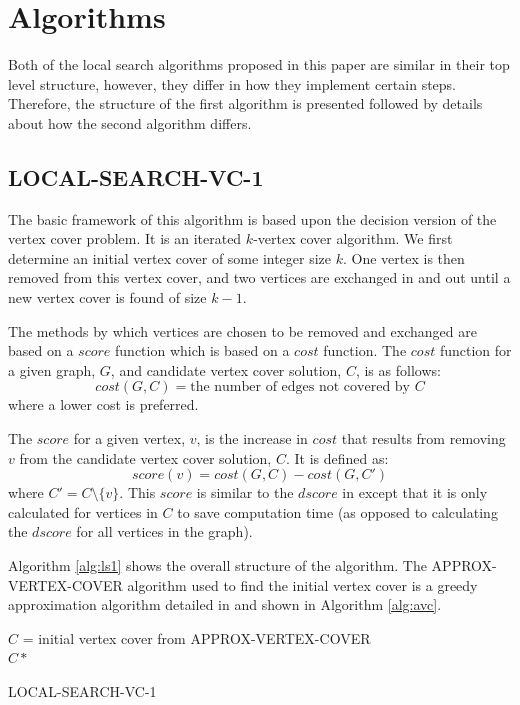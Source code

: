 \documentclass[sigconf]{acmart}
\begin{document}
\section{Algorithms}
Both of the local search algorithms proposed in this paper are similar in their top level structure, however, they differ in how they implement certain steps. Therefore, the structure of the first algorithm is presented followed by details about how the second algorithm differs.
\subsection{LOCAL-SEARCH-VC-1}
The basic framework of this algorithm is based upon the decision version of the vertex cover problem. It is an iterated $k$-vertex cover algorithm. We first determine an initial vertex cover of some integer size $k$. One vertex is then removed from this vertex cover, and two vertices are exchanged in and out until a new vertex cover is found of size $k - 1$.

The methods by which vertices are chosen to be removed and exchanged are based on a $score$ function which is based on a $cost$ function. The $cost$ function for a given graph, $G$, and candidate vertex cover solution, $C$, is as follows:
\begin{equation*}
	cost(G,C) = \text{the number of edges not covered by $C$}
\end{equation*}
where a lower cost is preferred.

The $score$ for a given vertex, $v$, is the increase in $cost$ that results from removing $v$ from the candidate vertex cover solution, $C$. It is defined as:
\begin{equation*}
	score(v) = cost(G,C) - cost(G,C')
\end{equation*}
where $C' = C \setminus \{v\}$. This $score$ is similar to the $dscore$ in \cite{cai2013numvc} except that it is only calculated for vertices in $C$ to save computation time (as opposed to calculating the $dscore$ for all vertices in the graph).

Algorithm \ref{alg:ls1} shows the overall structure of the algorithm. The APPROX-VERTEX-COVER algorithm used to find the initial vertex cover is a greedy approximation algorithm detailed in \cite{intro_alg_2009} and shown in Algorithm \ref{alg:avc}.

\begin{algorithm}[h]
	\SetAlgoNoLine
	$C$ = initial vertex cover from APPROX-VERTEX-COVER\\
	\Return $C*$
	\caption{LOCAL-SEARCH-VC-1}
	\label{alg:ls1}
\end{algorithm}
\end{document}
